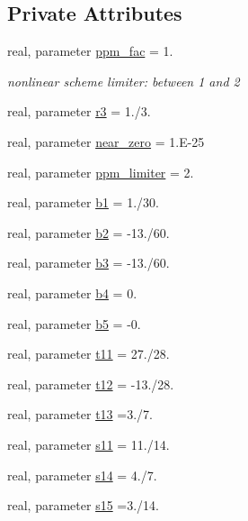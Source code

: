 \subsection*{Private Attributes}
\begin{DoxyCompactItemize}
\item 
real, parameter \hyperlink{classtp__core__mod_a39a84861aa5da93b744b78115c51961a}{ppm\-\_\-fac} = 1.
\begin{DoxyCompactList}\small\item\em nonlinear scheme limiter\-: between 1 and 2 \end{DoxyCompactList}\item 
real, parameter \hyperlink{classtp__core__mod_ac6e3f3772126b08884ee0df1afe3897d}{r3} = 1./3.
\item 
real, parameter \hyperlink{classtp__core__mod_ad41545dca954897d2750ebd81663ba71}{near\-\_\-zero} = 1.E-\/25
\item 
real, parameter \hyperlink{classtp__core__mod_a0b1f38c1d0fc65b85d98a3b12e8bde0a}{ppm\-\_\-limiter} = 2.
\item 
real, parameter \hyperlink{classtp__core__mod_ae2f7d92361a24ace46bb016d2fb637f7}{b1} = 1./30.
\item 
real, parameter \hyperlink{classtp__core__mod_af2c562b8f5f1323c0370471cad118c1b}{b2} = -\/13./60.
\item 
real, parameter \hyperlink{classtp__core__mod_a00dd6f4661e442eb30d04d8f11500a95}{b3} = -\/13./60.
\item 
real, parameter \hyperlink{classtp__core__mod_ad99c7da817a0f40d730b20e3db7cc3af}{b4} = 0.
\item 
real, parameter \hyperlink{classtp__core__mod_a22ee5d4e802fbdee793cd3cf2d976281}{b5} = -\/0.
\item 
real, parameter \hyperlink{classtp__core__mod_aaad141ba3705e5defdbaa59ece28c51f}{t11} = 27./28.
\item 
real, parameter \hyperlink{classtp__core__mod_a5f8e8b3c382dd0f93a01a0968b4d290c}{t12} = -\/13./28.
\item 
real, parameter \hyperlink{classtp__core__mod_a84fa887f4b8538ed2c628be08aeea165}{t13} =3./7.
\item 
real, parameter \hyperlink{classtp__core__mod_a01eb84f706485179c2638d9e625923b3}{s11} = 11./14.
\item 
real, parameter \hyperlink{classtp__core__mod_a3e606f8de1699c471fdb95289df0e033}{s14} = 4./7.
\item 
real, parameter \hyperlink{classtp__core__mod_aa0b566db71890d0741be14cb78f1b803}{s15} =3./14.

\end{DoxyCompactItemize}
